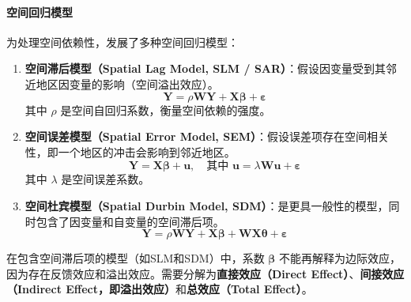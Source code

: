 \paragraph*{空间回归模型}
为处理空间依赖性，发展了多种空间回归模型：
\begin{enumerate}
    \item \textbf{空间滞后模型（Spatial Lag Model, SLM / SAR）}：假设因变量受到其邻近地区因变量的影响（空间溢出效应）。
    \begin{equation}
    \mathbf{Y} = \rho \mathbf{W}\mathbf{Y} + \mathbf{X}\boldsymbol{\beta} + \boldsymbol{\varepsilon}
    \end{equation}
    其中 $\rho$ 是空间自回归系数，衡量空间依赖的强度。

    \item \textbf{空间误差模型（Spatial Error Model, SEM）}：假设误差项存在空间相关性，即一个地区的冲击会影响到邻近地区。
    \begin{equation}
    \mathbf{Y} = \mathbf{X}\boldsymbol{\beta} + \mathbf{u}, \quad \text{其中 } \mathbf{u} = \lambda \mathbf{W}\mathbf{u} + \boldsymbol{\varepsilon}
    \end{equation}
    其中 $\lambda$ 是空间误差系数。

    \item \textbf{空间杜宾模型（Spatial Durbin Model, SDM）}：是更具一般性的模型，同时包含了因变量和自变量的空间滞后项。
    \begin{equation}
    \mathbf{Y} = \rho \mathbf{W}\mathbf{Y} + \mathbf{X}\boldsymbol{\beta} + \mathbf{W}\mathbf{X}\boldsymbol{\theta} + \boldsymbol{\varepsilon}
    \end{equation}
\end{enumerate}

在包含空间滞后项的模型（如SLM和SDM）中，系数 $\boldsymbol{\beta}$ 不能再解释为边际效应，因为存在反馈效应和溢出效应。需要分解为\textbf{直接效应（Direct Effect）}、\textbf{间接效应（Indirect Effect，即溢出效应）}和\textbf{总效应（Total Effect）}。

